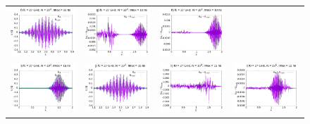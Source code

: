 \documentclass[11pt,a4paper]{report}
\begin{document}
\begin{figure}
\begin{tabular}{cccc}
\includegraphics[width=45mm]{plots/27/closeup/mc27_3_10} &    \includegraphics[width=45mm]{plots/27/mc27_3_10_dif} &   \includegraphics[width=45mm]{plots/27/mc27_5_10_dif} \\
\includegraphics[width=45mm]{plots/27/mc27_3_15} &   
\includegraphics[width=45mm]{plots/27/closeup/mc27_3_15} &    \includegraphics[width=45mm]{plots/27/mc27_3_15_dif} &   \includegraphics[width=45mm]{plots/27/mc27_5_15_dif} \\

\end{tabular}
\end{figure}
\end{document}
